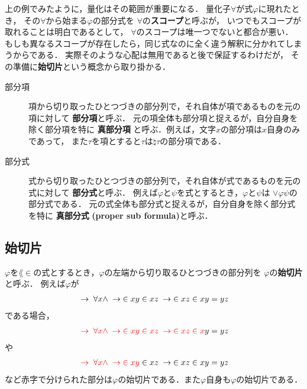 	上の例でみたように，量化はその範囲が重要になる．
	量化子$\forall$が式$\varphi$に現れたとき，
	その$\forall$から始まる$\varphi$の部分式を
	$\forall$の{\bf スコープ}と呼ぶが，
	いつでもスコープが取れることは明白であるとして，
	$\forall$のスコープは唯一つでないと都合が悪い．
	もしも異なるスコープが存在したら，同じ式なのに全く違う解釈に分かれてしまうからである．
	実際そのような心配は無用であると後で保証するわけだが，
	その準備に{\bf 始切片}という概念から取り掛かる．
	
	\begin{screen}
		\begin{metadfn}\mbox{}
			\begin{description}
				\item[部分項]
					項から切り取ったひとつづきの部分列で，それ自体が項であるものを元の項に対して
					{\bf 部分項}と呼ぶ．
					元の項全体も部分項と捉えるが，自分自身を除く部分項を特に
					{\bf 真部分項}
					と呼ぶ．例えば，文字$x$の部分項は$x$自身のみであって，
					また$\tau$を項とすると$\tau$は$\natural \tau$の部分項である．
		
				\item[部分式]
					式から切り取ったひとつづきの部分列で，それ自体が式であるものを元の式に対して
					{\bf 部分式}と呼ぶ．
					例えば$\varphi$と$\psi$を式とするとき，$\varphi$と$\psi$は
					$\vee \varphi \psi$の部分式である．
					元の式全体も部分式と捉えるが，自分自身を除く部分式を特に
					{\bf 真部分式}
					{\bf (proper sub formula)}と呼ぶ．
			\end{description}
		\end{metadfn}
	\end{screen}
	
\subsection{始切片}
	$\varphi$を$\lang{\in}$の式とするとき，$\varphi$の左端から切り取るひとつづきの部分列を
	$\varphi$の{\bf 始切片}と呼ぶ．
	例えば$\varphi$が
	\begin{align}
		\hspace{0.25em}\rightarrow\hspace{0.25em} \forall x \wedge \hspace{0.25em}\rightarrow\hspace{0.25em} \in xy \in xz \hspace{0.25em}\rightarrow\hspace{0.25em} \in xz \in xy = yz
	\end{align}
	である場合，
	\begin{align}
		\textcolor{red}{\hspace{0.25em}\rightarrow\hspace{0.25em} \forall x \wedge \hspace{0.25em}\rightarrow\hspace{0.25em} \in xy \in xz \hspace{0.25em}\rightarrow\hspace{0.25em} \in xz \in x}y = yz
	\end{align}
	や
	\begin{align}
		\textcolor{red}{\hspace{0.25em}\rightarrow\hspace{0.25em} \forall x \wedge \hspace{0.25em}\rightarrow\hspace{0.25em} \in xy} \in xz \hspace{0.25em}\rightarrow\hspace{0.25em} \in xz \in xy = yz
	\end{align}
	など赤字で分けられた部分は$\varphi$の始切片である．また$\varphi$自身も$\varphi$の始切片である．
	
